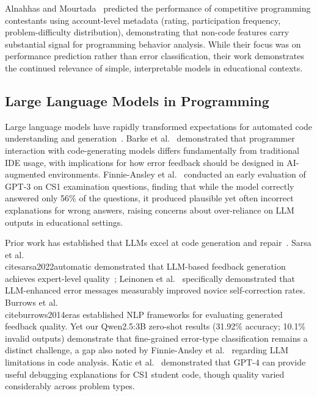 \documentclass[acmsmall]{acmart}
\begin{document}
Alnahhas and Mourtada~\cite{alnahhas2020predicting} predicted the
performance of competitive programming contestants using account-level
metadata (rating, participation frequency, problem-difficulty distribution),
demonstrating that non-code features carry substantial signal for programming
behavior analysis. While their focus was on performance prediction rather than
error classification, their work demonstrates the continued relevance of simple,
interpretable models
in educational contexts.

\subsection{Large Language Models in Programming}

Large language models have rapidly transformed expectations for automated code
understanding and generation~\cite{barke2023grounded}. Barke et al.~\cite{barke2023grounded} demonstrated that programmer interaction with
code-generating models differs fundamentally from traditional IDE usage, with implications for
how error feedback should be designed in AI-augmented environments. Finnie-Ansley et
al.~\cite{finnie2022robots}
conducted an early evaluation of GPT-3 on CS1 examination questions, finding
that while the model correctly answered only 56\% of the questions, it
produced plausible yet often incorrect explanations for wrong answers,
raising concerns about over-reliance on LLM outputs in educational settings.

Prior work has established that LLMs excel at code generation and
repair~\cite{kazemitabaar2024impact,sarsa2022automatic}. Sarsa et al.~\\cite{sarsa2022automatic} demonstrated that LLM-based feedback generation
achieves expert-level quality~\cite{leinonen2023using}; Leinonen et al.~\cite{leinonen2023using} specifically demonstrated that LLM-enhanced
error messages measurably improved novice self-correction rates. Burrows et al.~\\cite{burrows2014eras} established NLP frameworks for evaluating generated feedback quality. Yet our Qwen2.5:3B zero-shot results
(31.92\% accuracy; 10.1\% invalid outputs) demonstrate that fine-grained error-type classification remains a distinct
challenge, a gap also noted by Finnie-Ansley et
al.~\cite{finnie2022robots} regarding LLM limitations in code analysis. Katic
et al.~\cite{raihan2025large} demonstrated that GPT-4 can provide useful
debugging explanations for CS1 student code, though quality varied
considerably across problem types.
\end{document}
